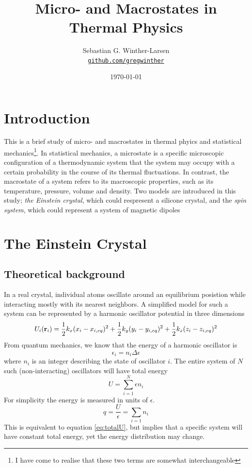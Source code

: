 \documentclass[10pt,a4paper]{amsart}
\title[Micro and Macrostates in Thermal Physics]{Micro- and Macrostates in Thermal Physics \\
	\hrulefill\fbox{FYS2160}\hrulefill}
\author[Winther-Larsen]{Sebastian G. Winther-Larsen\\
\href{https://github.com/gregwinther/FYS2160/}{\texttt{github.com/gregwinther}}}
\date{\today}
\begin{document}
\maketitle

\tableofcontents

\section{Introduction}
This is a brief study of micro- and macrostates in thermal phyics and statistical mechanics\footnote{I have come to realise that these two terms are somewhat interchangeable}. In statistical mechanics, a microstate is a specific microscopic configuration of a thermodynamic system that the system may occupy with a certain probability in the course of its thermal fluctuations. In contrast, the macrostate of a system refers to its macroscopic properties, such as its temperature, pressure, volume and density. Two models are introduced in this study; \emph{the Einstein crystal}, which could respresent a silicone crystal, and the \emph{spin system}, which could represent a system of magnetic dipoles

\section{The Einstein Crystal}

\subsection{Theoretical background}
In a real crystal, individual atoms oscillate around an equilibrium posistion while interacting mostly with its nearest neighbors. A simplified model for such a system can be represented by a harmonic oscillator potential in three dimensions
\begin{equation}
U_i(\vb{r}_i)=\frac{1}{2}k_x(x_i-x_{i,eq})^2+\frac{1}{2}k_y(y_i-y_{i,eq})^2+\frac{1}{2}k_z(z_i-z_{i,eq})^2
\end{equation} 
From quantum mechanics, we know that the energy of a harmonic oscillator is
\begin{equation}
\epsilon_i=n_i\Delta \epsilon
\end{equation}
where $n_i$ is an integer describing the state of oscillator $i$. The entire system of $N$ such (non-interacting) oscillators will have total energy
\begin{equation}
\label{eq:totalU}
U=\sum_{i=1}^N \epsilon n_i
\end{equation}
For simplicity the energy is measured in units of $\epsilon$.
\begin{equation}
\label{eq:totalU2}
q = \frac{U}{\epsilon}=\sum_{i=1} n_i
\end{equation}
This is equivalent to equation \ref{eq:totalU}, but implies that a specific system will have constant total energy, yet the energy distribution may change.
\end{document}
